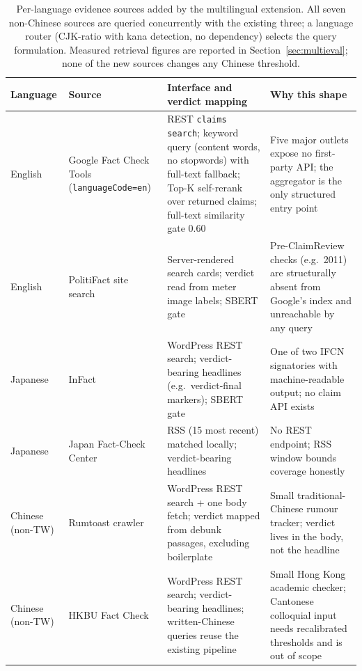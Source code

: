 \documentclass[twoside]{llncs}
\begin{document}
\begin{table}[!htbp]
\caption{Per-language evidence sources added by the multilingual extension. All seven non-Chinese sources are queried concurrently with the existing three; a language router (CJK-ratio with kana detection, no dependency) selects the query formulation. Measured retrieval figures are reported in Section~\ref{sec:multieval}; none of the new sources changes any Chinese threshold.}
\label{tab:multisrc}
\centering
\small
\begin{tabular}{>{\raggedright\arraybackslash}p{1.55cm} >{\raggedright\arraybackslash}p{3.1cm} >{\raggedright\arraybackslash}p{3.6cm} >{\raggedright\arraybackslash}p{2.0cm}}
\toprule
\textbf{Language} & \textbf{Source} & \textbf{Interface and verdict mapping} & \textbf{Why this shape} \\
\midrule
English & Google Fact Check Tools (\texttt{languageCode=en}) & REST \texttt{claims search}; keyword query (content words, no stopwords) with full-text fallback; Top-K self-rerank over returned claims; full-text similarity gate $0.60$ & Five major outlets expose no first-party API; the aggregator is the only structured entry point \\
English & PolitiFact site search & Server-rendered search cards; verdict read from meter image labels; SBERT gate & Pre-ClaimReview checks (e.g.\ 2011) are structurally absent from Google's index and unreachable by any query \\
Japanese & InFact & WordPress REST search; verdict-bearing headlines (e.g.\ verdict-final markers); SBERT gate & One of two IFCN signatories with machine-readable output; no claim API exists \\
Japanese & Japan Fact-Check Center & RSS (15 most recent) matched locally; verdict-bearing headlines & No REST endpoint; RSS window bounds coverage honestly \\
Chinese (non-TW) & Rumtoast crawler & WordPress REST search + one body fetch; verdict mapped from debunk passages, excluding boilerplate & Small traditional-Chinese rumour tracker; verdict lives in the body, not the headline \\
Chinese (non-TW) & HKBU Fact Check & WordPress REST search; verdict-bearing headlines; written-Chinese queries reuse the existing pipeline & Small Hong Kong academic checker; Cantonese colloquial input needs recalibrated thresholds and is out of scope \\
\bottomrule
\end{tabular}
\end{table}
\end{document}
